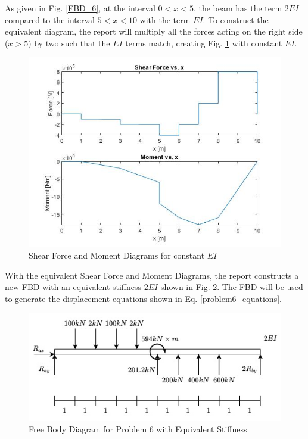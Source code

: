 \documentclass[a4paper]{article}
\begin{document}
As given in Fig. \ref{FBD_6}, at the interval $0<x<5$, the beam has the term $2EI$ compared to the interval $5<x<10$ with the term $EI$. To construct the equivalent diagram, the report will multiply all the forces acting on the right side ($x>5$) by two such that the $EI$ terms match, creating Fig. \ref{eq6} with constant $EI$.

\begin{figure}[h]
\includegraphics[width=\textwidth]{results/eq6.jpg}
\caption{Shear Force and Moment Diagrams for constant $EI$}
\label{eq6}
\end{figure}

With the equivalent Shear Force and Moment Diagrams, the report constructs a new FBD with an equivalent stiffness $2EI$ shown in Fig. \ref{FBD_6_new}. The FBD will be used to generate the displacement equations shown in Eq. \ref{problem6_equations}.

\begin{figure}[h]
\includegraphics[width=\textwidth]{FBD/FBD_6_new.jpg}
\caption{Free Body Diagram for Problem 6 with Equivalent Stiffness}
\label{FBD_6_new}
\end{figure}
\end{document}
